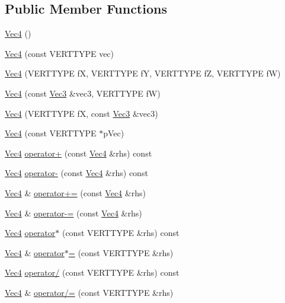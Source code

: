 \subsection*{Public Member Functions}
\begin{DoxyCompactItemize}
\item 
\hyperlink{struct_vec4_a55a46de1fc067fd2d696ea5be485ce3c}{Vec4} ()
\item 
\hyperlink{struct_vec4_aed2a417ccf1f429087460e042c20dc4b}{Vec4} (const VERTTYPE vec)
\item 
\hyperlink{struct_vec4_ac3420586262f1460a19bdc625cb0cd70}{Vec4} (VERTTYPE fX, VERTTYPE fY, VERTTYPE fZ, VERTTYPE fW)
\item 
\hyperlink{struct_vec4_a27a74a1bfcf02fa2ef3e9df1edae0cf1}{Vec4} (const \hyperlink{struct_vec3}{Vec3} \&vec3, VERTTYPE fW)
\item 
\hyperlink{struct_vec4_a4d835393a22dd63493edf3e8a482577d}{Vec4} (VERTTYPE fX, const \hyperlink{struct_vec3}{Vec3} \&vec3)
\item 
\hyperlink{struct_vec4_ace297c9e31bf59ad501edd8a3100fd7b}{Vec4} (const VERTTYPE $\ast$pVec)
\item 
\hyperlink{struct_vec4}{Vec4} \hyperlink{struct_vec4_a554212735104bf104a71d153efaca2e3}{operator+} (const \hyperlink{struct_vec4}{Vec4} \&rhs) const 
\item 
\hyperlink{struct_vec4}{Vec4} \hyperlink{struct_vec4_ac0edd4d37c9fb02fe748a498f1a2eae5}{operator-\/} (const \hyperlink{struct_vec4}{Vec4} \&rhs) const 
\item 
\hyperlink{struct_vec4}{Vec4} \& \hyperlink{struct_vec4_ae219a3439b8dd9ec35b650493a827dbd}{operator+=} (const \hyperlink{struct_vec4}{Vec4} \&rhs)
\item 
\hyperlink{struct_vec4}{Vec4} \& \hyperlink{struct_vec4_a88330d34db84918976bbeb1d6a2d0a4e}{operator-\/=} (const \hyperlink{struct_vec4}{Vec4} \&rhs)
\item 
\hyperlink{struct_vec4}{Vec4} \hyperlink{struct_vec4_ae1da206aa970eff532caf853f5218808}{operator$\ast$} (const VERTTYPE \&rhs) const 
\item 
\hyperlink{struct_vec4}{Vec4} \& \hyperlink{struct_vec4_aee1e370041c976ff68c60f9267e79244}{operator$\ast$=} (const VERTTYPE \&rhs)
\item 
\hyperlink{struct_vec4}{Vec4} \hyperlink{struct_vec4_a3266f16bb0f4bf2b375a43216d17ebd5}{operator/} (const VERTTYPE \&rhs) const 
\item 
\hyperlink{struct_vec4}{Vec4} \& \hyperlink{struct_vec4_aecc8e1d29c0d19356f4bd8f28f832b55}{operator/=} (const VERTTYPE \&rhs)

\end{DoxyCompactItemize}
